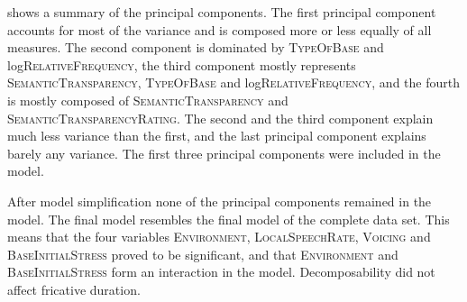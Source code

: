 shows a summary of the principal components. The first principal component accounts for most of the variance and is composed more or less equally of all measures. The second component is dominated by \textsc{TypeOfBase} and log\textsc{RelativeFrequency}, the third component mostly represents \textsc{SemanticTransparency}, \textsc{TypeOfBase} and log\textsc{RelativeFrequency}, and the fourth is mostly composed of \textsc{SemanticTransparency} and \textsc{SemanticTransparencyRating}. The second and the third component explain much less variance than the first, and the last principal component explains barely any variance. The first three principal components were included in the model.



After model simplification none of the principal components remained in the model. The final model resembles the final model of the complete data set. This means that the four variables \textsc{Environment}, \textsc{LocalSpeechRate}, \textsc{Voicing} and \textsc{BaseInitialStress} proved to be significant, and that \textsc{Environment} and \textsc{BaseInitialStress} form an interaction in the model. Decomposability did not affect fricative duration. 


\begin{table}
	\caption{Summary of principal components\label{tbl: summary PC discorpus}}
\end{table}

